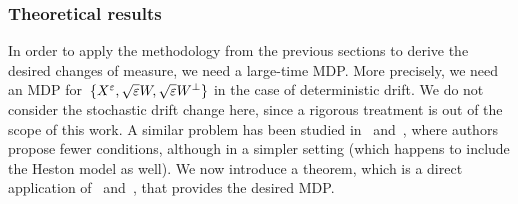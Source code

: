 \subsubsection{Theoretical results}
In order to apply the methodology from the previous sections to derive the desired changes of measure, we need a large-time MDP. More precisely, we need an MDP for~$\{X^{\varepsilon},\sqrt{\varepsilon}W,\sqrt{\varepsilon}W^{\perp}\}$ in the case of deterministic drift. We do not consider the stochastic drift change here, since a rigorous treatment is out of the scope of this work.
A similar problem has been studied in~\cite[Theorem 2.1]{Morse2017ModerateDiffusions} and~\cite[Theorem 3.3]{Jacquier2019PathwisePricing}, where authors propose fewer conditions, although in a simpler setting (which happens to include the Heston model as well). %
We now introduce a theorem, which is a direct application of~\cite[Theorem~3.3]{Jacquier2019PathwisePricing} and~\cite[Theorem~2.1]{Morse2017ModerateDiffusions}, that provides the desired MDP.

